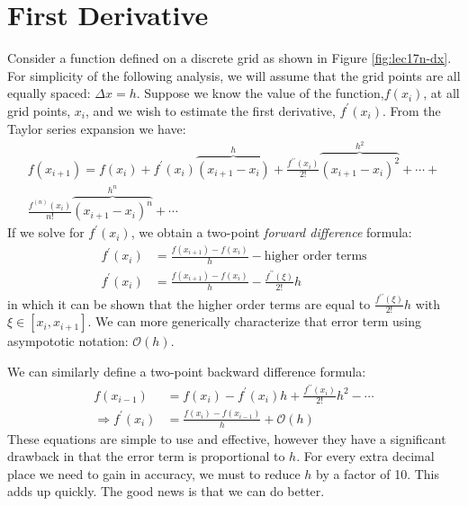\section{First Derivative}
Consider a function defined on a discrete grid as shown in Figure \ref{fig:lec17n-dx}.  For simplicity of the following analysis, we will assume that the grid points are all equally spaced: $\Delta x = h$.  Suppose we know the value of the function,$f(x_i)$, at all grid points, $x_i$, and we wish to estimate the first derivative, $f^{\prime}(x_i)$.  From the Taylor series expansion we have:
\begin{multline*}
f(x_{i+1}) = f(x_i) + f^{\prime}(x_i)\overbrace{(x_{i+1}-x_i)}^{h} + \frac{f^{\prime \prime}(x_i)}{2!}\overbrace{(x_{i+1} - x_i)^2}^{h^2} + \cdots + \\ \frac{f^{(n)}(x_i)}{n!}\overbrace{(x_{i+1}-x_i)^n}^{h^n} + \cdots
\end{multline*}
If we solve for $f^{\prime}(x_i)$, we obtain a two-point \emph{forward difference} formula:
\begin{align*}
f^{\prime}(x_i) &= \frac{f(x_{i+1}) - f(x_i)}{h} - \text{higher order terms} \\
f^{\prime}(x_i) &= \frac{f(x_{i+1}) - f(x_i)}{h} - \frac{f^{\prime \prime}(\xi)}{2!}h
\end{align*}
in which it can be shown that the higher order terms are equal to $\frac{f^{\prime \prime}(\xi)}{2!}h$ with $\xi \in [x_{i},x_{i+1}]$.  We can more generically characterize that error term using asympototic notation: $\mathcal{O}(h)$.

We can similarly define a two-point backward difference formula:
\begin{align*}
f(x_{i-1}) &= f(x_i) - f^{\prime}(x_i)h + \frac{f^{\prime \prime}(x_i)}{2!}h^2 - \cdots \\
\Rightarrow f^{\prime}(x_{i}) &= \frac{f(x_i) - f(x_{i-1})}{h} + \mathcal{O}(h)
\end{align*}
These equations are simple to use and effective, however they have a significant drawback in that the error term is proportional to $h$.  For every extra decimal place we need to gain in accuracy, we must to reduce $h$ by a factor of 10.  This adds up quickly.  The good news is that we can do better.  

